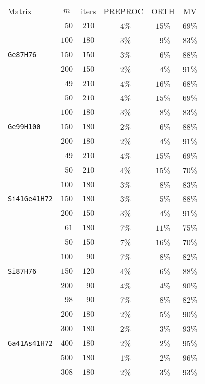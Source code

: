 \begin{tabular}{l|c|c|c|c|c}
\hline
\multirow{2}{*}{Matrix} & \multirow{2}{*}{$m$} & \multirow{2}{*}{iters} & \multirow{2}{*}{PREPROC} & \multirow{2}{*}{ORTH} & \multirow{2}{*}{MV} \\
 & & & & & \\\hline
\hline
  & $\phantom{0}50$ & $210$ & $\phantom{0}4$\% & $15$\% & $69$\%\\
  & $100$ & $180$ & $\phantom{0}3$\% & $\phantom{0}9$\% & $83$\%\\
\verb|Ge87H76| & $150$ & $150$ & $\phantom{0}3$\% & $\phantom{0}6$\% & $88$\%\\
  & $200$ & $150$ & $\phantom{0}2$\% & $\phantom{0}4$\% & $91$\%\\
  & $\phantom{0}49$ & $210$ & $\phantom{0}4$\% & $16$\% & $68$\%\\\hline
  & $\phantom{0}50$ & $210$ & $\phantom{0}4$\% & $15$\% & $69$\%\\
  & $100$ & $180$ & $\phantom{0}3$\% & $\phantom{0}8$\% & $83$\%\\
\verb|Ge99H100| & $150$ & $180$ & $\phantom{0}2$\% & $\phantom{0}6$\% & $88$\%\\
  & $200$ & $180$ & $\phantom{0}2$\% & $\phantom{0}4$\% & $91$\%\\
  & $\phantom{0}49$ & $210$ & $\phantom{0}4$\% & $15$\% & $69$\%\\\hline
  & $\phantom{0}50$ & $210$ & $\phantom{0}4$\% & $15$\% & $70$\%\\
  & $100$ & $180$ & $\phantom{0}3$\% & $\phantom{0}8$\% & $83$\%\\
\verb|Si41Ge41H72| & $150$ & $180$ & $\phantom{0}3$\% & $\phantom{0}5$\% & $88$\%\\
  & $200$ & $150$ & $\phantom{0}3$\% & $\phantom{0}4$\% & $91$\%\\
  & $\phantom{0}61$ & $180$ & $\phantom{0}7$\% & $11$\% & $75$\%\\\hline
  & $\phantom{0}50$ & $150$ & $\phantom{0}7$\% & $16$\% & $70$\%\\
  & $100$ & $\phantom{0}90$ & $\phantom{0}7$\% & $\phantom{0}8$\% & $82$\%\\
\verb|Si87H76| & $150$ & $120$ & $\phantom{0}4$\% & $\phantom{0}6$\% & $88$\%\\
  & $200$ & $\phantom{0}90$ & $\phantom{0}4$\% & $\phantom{0}4$\% & $90$\%\\
  & $\phantom{0}98$ & $\phantom{0}90$ & $\phantom{0}7$\% & $\phantom{0}8$\% & $82$\%\\\hline
  & $200$ & $180$ & $\phantom{0}2$\% & $\phantom{0}5$\% & $90$\%\\
  & $300$ & $180$ & $\phantom{0}2$\% & $\phantom{0}3$\% & $93$\%\\
\verb|Ga41As41H72| & $400$ & $180$ & $\phantom{0}2$\% & $\phantom{0}2$\% & $95$\%\\
  & $500$ & $180$ & $\phantom{0}1$\% & $\phantom{0}2$\% & $96$\%\\
  & $308$ & $180$ & $\phantom{0}2$\% & $\phantom{0}3$\% & $93$\%\\\hline
\end{tabular}